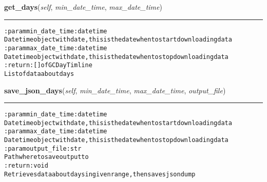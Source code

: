\hspace{.8\funcindent}\begin{boxedminipage}{\funcwidth}

    \raggedright \textbf{get\_days}(\textit{self}, \textit{min\_date\_time}, \textit{max\_date\_time})

    \vspace{-1.5ex}

    \rule{\textwidth}{0.5\fboxrule}
\setlength{\parskip}{2ex}
\begin{alltt}

:param min\_date\_time: datetime
    Datetime object with date, this is the date when to start downloading data
:param max\_date\_time: datetime
    Datetime object with date, this is the date when to stop downloading data
:return: [] of GCDayTimline
    List of data about days
\end{alltt}

\setlength{\parskip}{1ex}
    \end{boxedminipage}

    \label{pygce:models:bot:GarminConnectBot:save_json_days}

    \vspace{0.5ex}

\hspace{.8\funcindent}\begin{boxedminipage}{\funcwidth}

    \raggedright \textbf{save\_json\_days}(\textit{self}, \textit{min\_date\_time}, \textit{max\_date\_time}, \textit{output\_file})

    \vspace{-1.5ex}

    \rule{\textwidth}{0.5\fboxrule}
\setlength{\parskip}{2ex}
\begin{alltt}

:param min\_date\_time: datetime
    Datetime object with date, this is the date when to start downloading data
:param max\_date\_time: datetime
    Datetime object with date, this is the date when to stop downloading data
:param output\_file: str
    Path where to save output to
:return: void
    Retrieves data about days in given range, then saves json dump
\end{alltt}

\setlength{\parskip}{1ex}
    \end{boxedminipage}

